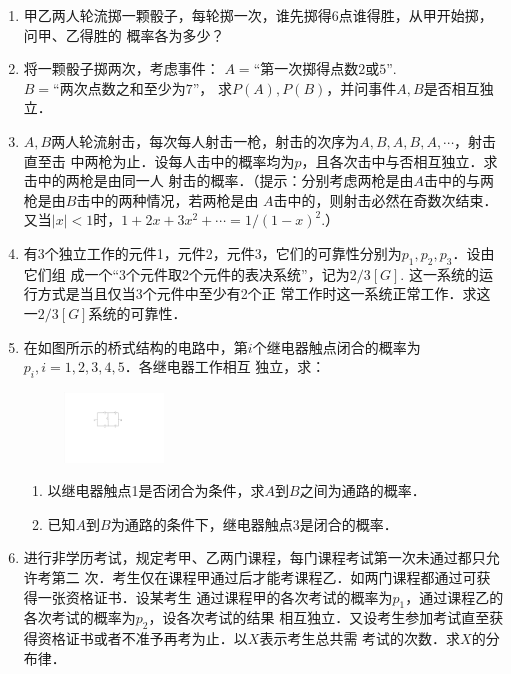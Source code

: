 \documentclass[10pt,a4paper]{article}
\begin{document}
\begin{enumerate}
    \item 甲乙两人轮流掷一颗骰子，每轮掷一次，谁先掷得6点谁得胜，从甲开始掷，问甲、乙得胜的
    概率各为多少？



    \item 将一颗骰子掷两次，考虑事件： $A=\mbox{“第一次掷得点数2或5”}$.$B=\mbox{“两次点数之和至少为7”}$，
    求$P(A),P(B)$，并问事件$A,B$是否相互独立．



    \item $A,B$两人轮流射击，每次每人射击一枪，射击的次序为$A,B,A,B,A,\cdots$，射击直至击
    中两枪为止．设每人击中的概率均为$p$，且各次击中与否相互独立．求击中的两枪是由同一人
    射击的概率．（提示：分别考虑两枪是由$A$击中的与两枪是由$B$击中的两种情况，若两枪是由
    $A$击中的，则射击必然在奇数次结束．又当$|x|<1$时，$1+2x+3x^2+\cdots=1/(1-x)^2$.）


    \item 有3个独立工作的元件1，元件2，元件3，它们的可靠性分别为$p_1,p_2,p_3$．设由它们组
    成一个“3个元件取2个元件的表决系统”，记为$2/3[G]$. 这一系统的运行方式是当且仅当3个元件中至少有2个正
    常工作时这一系统正常工作．求这一$2/3[G]$系统的可靠性．



    \item 在如图所示的桥式结构的电路中，第$i$个继电器触点闭合的概率为$p_i,i=1,2,3,4,5$．各继电器工作相互
    独立，求：
    \begin{figure}[H]
        \flushright 
        \includegraphics[width=0.25\textwidth]{8.pdf}
    \end{figure}
    \vspace{-0.5cm}
    \begin{enumerate}
        \item 以继电器触点1是否闭合为条件，求$A$到$B$之间为通路的概率．
        \item 已知$A$到$B$为通路的条件下，继电器触点3是闭合的概率．
    \end{enumerate}


    \item 进行非学历考试，规定考甲、乙两门课程，每门课程考试第一次未通过都只允许考第二
    次．考生仅在课程甲通过后才能考课程乙．如两门课程都通过可获得一张资格证书．设某考生
    通过课程甲的各次考试的概率为$p_1$，通过课程乙的各次考试的概率为$p_2$，设各次考试的结果
    相互独立．又设考生参加考试直至获得资格证书或者不准予再考为止．以$X$表示考生总共需
    考试的次数．求$X$的分布律．



\end{enumerate}
\end{document}
